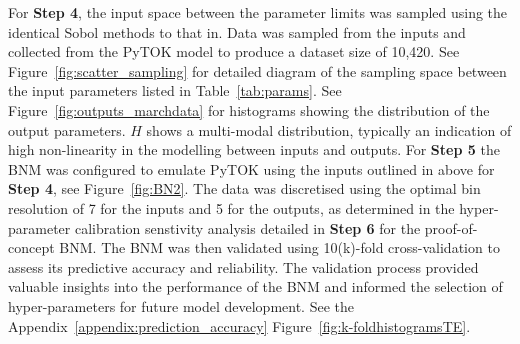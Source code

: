 \documentclass[journal]{IEEEtran}
\begin{document}
For \textbf{Step 4}, the input space between the parameter limits was sampled using the identical Sobol methods to that in\cite{Griffiths2024}. Data was sampled from the inputs and collected from the PyTOK model to produce a dataset size of 10,420. See Figure~\ref{fig:scatter_sampling} for detailed diagram of the sampling space between the input parameters listed in Table~\ref{tab:params}. See Figure~\ref{fig:outputs_marchdata} for histograms showing the distribution of the output parameters. $H$ shows a multi-modal distribution, typically an indication of high non-linearity in the modelling between inputs and outputs. 
For \textbf{Step 5} the BNM was configured to emulate PyTOK using the inputs outlined in above for \textbf{Step 4}, see Figure~\ref{fig:BN2}. The data was discretised using the optimal bin resolution of 7 for the inputs and 5 for the outputs, as determined in the hyper-parameter calibration senstivity analysis detailed in \textbf{Step 6} for the proof-of-concept BNM. The BNM was then validated using 10(k)-fold cross-validation to assess its predictive accuracy and reliability. The validation process provided valuable insights into the performance of the BNM and informed the selection of hyper-parameters for future model development. See the Appendix~\ref{appendix:prediction_accuracy} Figure~\ref{fig:k-foldhistogramsTE}.
\end{document}
